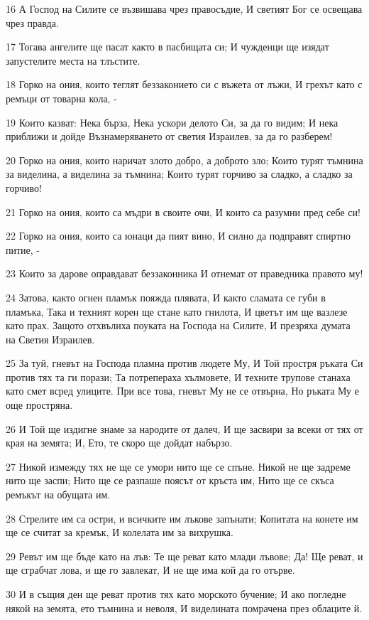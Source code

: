 \par 16 А Господ на Силите се възвишава чрез правосъдие, И светият Бог се освещава чрез правда.
\par 17 Тогава ангелите ще пасат както в пасбищата си; И чужденци ще изядат запустелите места на тлъстите.
\par 18 Горко на ония, които теглят беззаконието си с въжета от лъжи, И грехът като с ремъци от товарна кола, -
\par 19 Които казват: Нека бърза, Нека ускори делото Си, за да го видим; И нека приближи и дойде Възнамеряването от светия Израилев, за да го разберем!
\par 20 Горко на ония, които наричат злото добро, а доброто зло; Които турят тъмнина за виделина, а виделина за тъмнина; Които турят горчиво за сладко, а сладко за горчиво!
\par 21 Горко на ония, които са мъдри в своите очи, И които са разумни пред себе си!
\par 22 Горко на ония, които са юнаци да пият вино, И силно да подправят спиртно питие, -
\par 23 Които за дарове оправдават беззаконника И отнемат от праведника правото му!
\par 24 Затова, както огнен пламък пояжда плявата, И както сламата се губи в пламъка, Така и техният корен ще стане като гнилота, И цветът им ще вазлезе като прах. Защото отхвълиха поуката на Господа на Силите, И презряха думата на Светия Израилев.
\par 25 За туй, гневът на Господа пламна против людете Му, И Той простря ръката Си против тях та ги порази; Та потрепераха хълмовете, И техните трупове станаха като смет всред улиците. При все това, гневът Му не се отвърна, Но ръката Му е още простряна.
\par 26 И Той ще издигне знаме за народите от далеч, И ще засвири за всеки от тях от края на земята; И, Ето, те скоро ще дойдат набързо.
\par 27 Никой измежду тях не ще се умори нито ще се спъне. Никой не ще задреме нито ще заспи; Нито ще се разпаше поясът от кръста им, Нито ще се скъса ремъкът на обущата им.
\par 28 Стрелите им са остри, и всичките им лъкове запънати; Копитата на конете им ще се считат за кремък, И колелата им за вихрушка.
\par 29 Ревът им ще бъде като на лъв: Те ще реват като млади лъвове; Да! Ще реват, и ще сграбчат лова, и ще го завлекат, И не ще има кой да го отърве.
\par 30 И в същия ден ще реват против тях като морското бучение; И ако погледне някой на земята, ето тъмнина и неволя, И виделината помрачена през облаците й.

